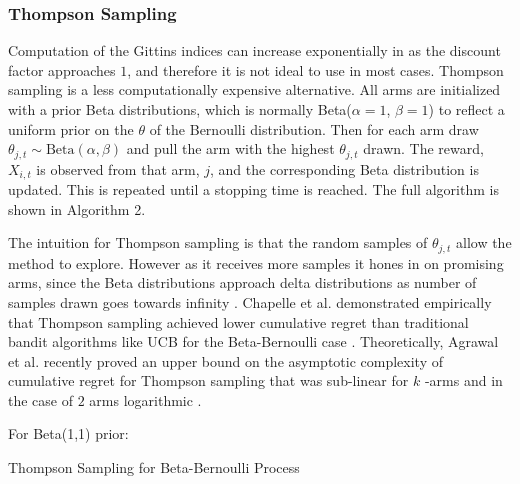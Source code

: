 \documentclass[a4paper, 10pt, conference]{ieeeconf}      %
\begin{document}
\subsubsection{Thompson Sampling}
Computation of the Gittins indices can increase exponentially in as the discount factor approaches $1$, and therefore it is not ideal to use in most cases. 
Thompson sampling is a less computationally expensive alternative.
All arms are initialized with a prior Beta distributions, which is normally Beta($\alpha=1$,  $\beta =1$) to reflect a uniform prior on the $\theta$ of the Bernoulli distribution.
Then for each arm draw $\theta_{j,t} \sim \mbox{Beta}(\alpha,\beta)$ and pull the arm with the highest $\theta_{j,t}$ drawn.
The reward, $X_{i,t}$ is observed from that arm, $j$, and the corresponding Beta distribution is updated.
This is repeated until a stopping time is reached. The full algorithm is shown in Algorithm 2.  

The intuition for Thompson sampling is that the random samples of $\theta_{j,t}$ allow the method to explore. However as it receives more samples it hones in on promising arms, since the Beta distributions approach delta distributions as number of samples drawn goes towards infinity \cite{goetschalckx2011continuous}. Chapelle et al. demonstrated empirically that Thompson sampling achieved lower cumulative regret than traditional bandit algorithms like UCB for the Beta-Bernoulli case \cite{chapelle2011empirical}. Theoretically, Agrawal et al. recently proved an upper bound on the asymptotic complexity of  cumulative regret for  Thompson sampling that was sub-linear  for $k$ -arms and in the case of $2$ arms logarithmic \cite{agrawal2011analysis}. 

\begin{algorithm}
 For Beta(1,1) prior: \\
 \caption{Thompson Sampling for Beta-Bernoulli Process}
\end{algorithm}
\vspace{-2ex}
\end{document}
